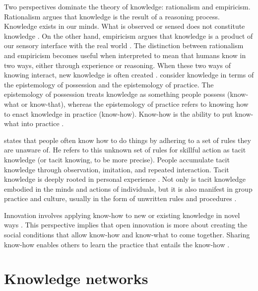 Two perspectives dominate the theory of knowledge: rationalism and empiricism. Rationalism argues that knowledge is the result of a reasoning process. Knowledge exists in our minds. What is observed or sensed does not constitute knowledge \citep{russell2009human}. On the other hand, empiricism argues that knowledge is a product of our sensory interface with the real world \citep{bolisani2018elusive}. The distinction between rationalism and empiricism becomes useful when interpreted to mean that humans know in two ways, either through experience or reasoning. When these two ways of knowing interact, new knowledge is often created \citep{spender1996making,bolisani2018elusive}. \citet{cook1999bridging} consider knowledge in terms of the epistemology of possession and the epistemology of practice. The epistemology of possession treats knowledge as something people possess (know-what or know-that), whereas the epistemology of practice refers to knowing how to enact knowledge in practice (know-how). Know-how is the ability to put know-what into practice \citep{cook1999bridging,tsoukas2001organizational, marabelli2014knowing}. \medskip

\citet{polanyi1966tacit} states that people often know how to do things by adhering to a set of rules they are unaware of. He refers to this unknown set of rules for skillful action as tacit knowledge (or tacit knowing, to be more precise). People accumulate tacit knowledge through observation, imitation, and repeated interaction. Tacit knowledge is deeply rooted in personal experience \citep{nonaka1995knowledge}. Not only is tacit knowledge embodied in the minds and actions of individuals, but it is also manifest in group practice and culture, usually in the form of unwritten rules and procedures \citep{munoz2015tacit}. \medskip

Innovation involves applying know-how to new or existing knowledge in novel ways \citep{van1986central,quintane2011innovation,garud2013perspectives}. This perspective implies that open innovation is more about creating the social conditions that allow know-how and know-what to come together. Sharing know-how enables others to learn the practice that entails the know-how \citep{van1986central,goksel2017can}.

\section{Knowledge networks}


